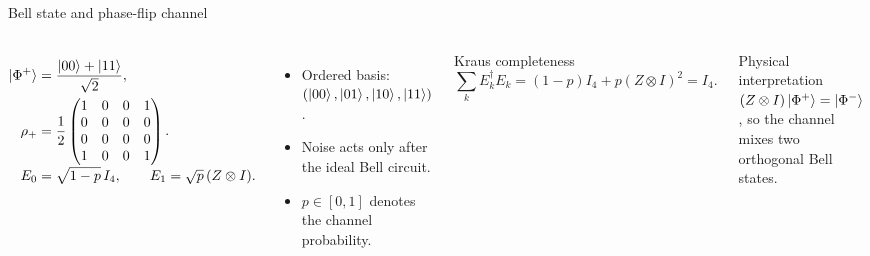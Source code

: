 \documentclass[10pt,aspectratio=169]{beamer}
\newcommand{\sourcefoot}[1]{}
\begin{document}
\begin{frame}[t]{Bell state and phase-flip channel}
\begin{columns}[T]
\begin{align*}
\ket{\Phi^+}&=\frac{\ket{00}+\ket{11}}{\sqrt2},\\
\rho_+&=\frac12\begin{pmatrix}1&0&0&1\\0&0&0&0\\0&0&0&0\\1&0&0&1\end{pmatrix}.\\[-1mm]
E_0&=\sqrt{1-p}\,I_4,\qquad E_1=\sqrt p\,(Z\otimes I).
\end{align*}
\begin{itemize}
  \item Ordered basis: $(\ket{00},\ket{01},\ket{10},\ket{11})$.
  \item Noise acts only after the ideal Bell circuit.
  \item $p\in[0,1]$ denotes the channel probability.
\end{itemize}
\begin{block}{Kraus completeness}
\[
\sum_k E_k^\dagger E_k=(1-p)I_4+p(Z\otimes I)^2=I_4.
\]
\end{block}
\begin{block}{Physical interpretation}
$(Z\otimes I)\ket{\Phi^+}=\ket{\Phi^-}$, so the channel mixes two orthogonal Bell states.
\end{block}
\end{columns}
\sourcefoot{Kraus construction and completeness: \texttt{src/phase\_error\_blind\_spot.py}.}
\end{frame}
\end{document}
